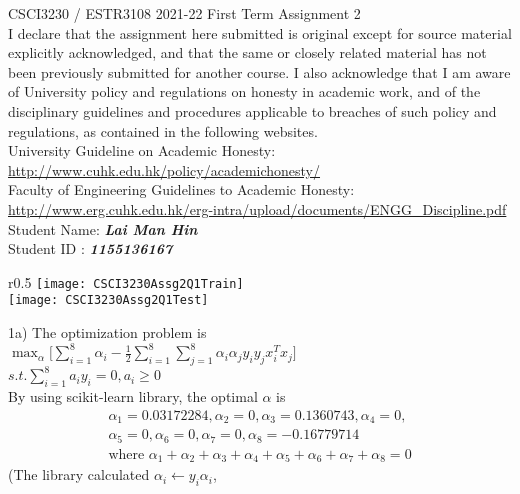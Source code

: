\documentclass[12pt]{article}
\begin{document}
\thispagestyle{firstpage}
CSCI3230 / ESTR3108 2021-22 First Term Assignment 2\\
I declare that the assignment here submitted is original except for source material explicitly acknowledged, and that the same or closely related material has not been previously submitted for another course. I also acknowledge that I am aware of University policy and regulations on honesty in academic work, and
of the disciplinary guidelines and procedures applicable to breaches of such policy and regulations, as contained in the following websites.\\
University Guideline on Academic Honesty:\\
\url{http://www.cuhk.edu.hk/policy/academichonesty/}\\
Faculty of Engineering Guidelines to Academic Honesty:\\
\url{http://www.erg.cuhk.edu.hk/erg-intra/upload/documents/ENGG_Discipline.pdf}\\
Student Name: \textit{\textbf{Lai Man Hin}}\\
Student ID : \textit{\textbf{1155136167}}\\
\begin{wrapfigure}[13]{r}{0.5\textwidth}
\texttt{[image: CSCI3230Assg2Q1Train]}\\
\texttt{[image: CSCI3230Assg2Q1Test]}
\end{wrapfigure}
1a) The optimization problem is \\$\max_{\alpha}\bigg[ \sum_{i=1}^{8} \alpha_{i} - \frac{1}{2}\sum_{i=1}^{8}\sum_{j=1}^{8}\alpha_{i}\alpha_{j}y_{i}y_{j}x_{i}^{T}x_{j} \bigg]$\\$s.t. \sum_{i=1}^{8}a_{i}y_{i} = 0, a_{i} \geq 0$
\\By using scikit-learn library, the optimal $\alpha$ is
\begin{align*}
\alpha_{1} = 0.03172284, \alpha_{2} = 0, \alpha_{3} = 0.1360743 , \alpha_{4} = 0,\\ \alpha_{5} = 0, \alpha_{6} = 0, \alpha_{7} = 0, \alpha_{8} = -0.16779714\\
\text{where } \alpha_{1}+\alpha_{2}+\alpha_{3}+\alpha_{4}+\alpha_{5}+\alpha_{6}+\alpha_{7}+\alpha_{8} = 0
\end{align*}
(The library calculated $\alpha_{i} \leftarrow y_{i}\alpha_{i}$,\\
\end{document}
